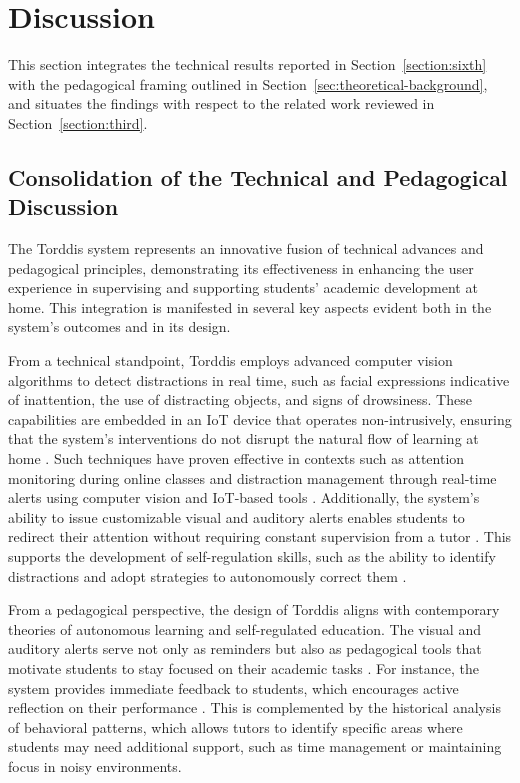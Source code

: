                 \section{Discussion}
                \label{section:discussion}
                This section integrates the technical results reported in Section~\ref{section:sixth} with the pedagogical framing outlined in Section~\ref{sec:theoretical-background}, and situates the findings with respect to the related work reviewed in Section~\ref{section:third}.

\subsection{Consolidation of the Technical and Pedagogical Discussion}
                The Torddis system represents an innovative fusion of technical advances and pedagogical principles, demonstrating its effectiveness in enhancing the user experience in supervising and supporting students’ academic development at home. This integration is manifested in several key aspects evident both in the system's outcomes and in its design.
                
                From a technical standpoint, Torddis employs advanced computer vision algorithms to detect distractions in real time, such as facial expressions indicative of inattention, the use of distracting objects, and signs of drowsiness. These capabilities are embedded in an IoT device that operates non-intrusively, ensuring that the system's interventions do not disrupt the natural flow of learning at home \citep{Roy2022, Chen2022, Ucar2022Recognizing, Asish2022Detecting}. Such techniques have proven effective in contexts such as attention monitoring during online classes and distraction management through real-time alerts using computer vision and IoT-based tools \citep{Chen2022, Ucar2022Recognizing}. Additionally, the system's ability to issue customizable visual and auditory alerts enables students to redirect their attention without requiring constant supervision from a tutor \citep{Ackermans2025Young}. This supports the development of self-regulation skills, such as the ability to identify distractions and adopt strategies to autonomously correct them \citep{Wang2025Development}.
                
                From a pedagogical perspective, the design of Torddis aligns with contemporary theories of autonomous learning and self-regulated education. The visual and auditory alerts serve not only as reminders but also as pedagogical tools that motivate students to stay focused on their academic tasks \citep{Mohamed2018Implementing}. For instance, the system provides immediate feedback to students, which encourages active reflection on their performance \citep{Ackermans2025Young}. This is complemented by the historical analysis of behavioral patterns, which allows tutors to identify specific areas where students may need additional support, such as time management or maintaining focus in noisy environments.
                
